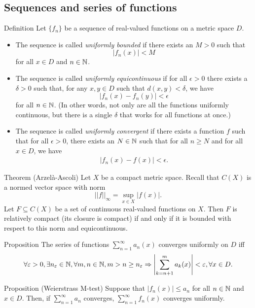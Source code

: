 \subsection{Sequences and series of functions}
\begin{defnbox}{Definition}
Let $\{f_n\}$ be a sequence of real-valued functions on a metric space $D$.
\begin{itemize}
    \item The sequence is called \emph{uniformly bounded} if there exists an $M > 0$ such that
    $$ |f_n(x)| < M $$
    for all $x \in D$ and $n \in \mathbb{N}$.
    \item The sequence is called \emph{uniformly equicontinuous} if for all $\epsilon > 0$ there exists a $\delta > 0$ such that, for any $x, y \in D$ such that $d(x,y) < \delta$, we have
    $$ |f_n(x) - f_n(y)| < \epsilon $$
    for all $n \in \mathbb{N}$. (In other words, not only are all the functions uniformly continuous, but there is a single $\delta$ that works for all functions at once.)
    \item The sequence is called \emph{uniformly convergent} if there exists a function $f$ such that for all $\epsilon > 0$, there exists an $N \in \mathbb{N}$ such that for all $n \ge N$ and for all $x\in D$, we have
    \begin{align*}
        |f_n(x) - f(x)| < \epsilon.
    \end{align*}
\end{itemize}
\end{defnbox}
\begin{thmbox}{Theorem (Arzelà-Ascoli)}
Let $X$ be a compact metric space. Recall that $C(X)$ is a normed vector space with norm
$$ ||f||_\infty = \sup_{x \in X} |f(x)|. $$
Let $F \subseteq C(X)$ be a set of continuous real-valued functions on $X$. Then $F$ is relatively compact (its closure is compact) if and only if it is bounded with respect to this norm and equicontinuous.
\end{thmbox}
\begin{thmbox}{Proposition}
The series of functions $\displaystyle{\sum_{n=1}^\infty} a_n(x)$ converges uniformly on $D$ iff
\begin{align*}
    \forall \varepsilon > 0, \exists n_\varepsilon \in \mathbb{N}, \forall m,n \in \mathbb{N}, m > n \ge n_\varepsilon \Rightarrow \left\lvert \sum_{k=n+1}^m a_k(x)\right\rvert < \varepsilon, \forall x \in D.
\end{align*}
\end{thmbox}
\begin{thmbox}{Proposition (Weierstrass M-test)}
Suppose that $|f_n(x)| \le a_n$ for all $n \in \mathbb{N}$ and $x \in D$. Then, if $\displaystyle{\sum_{n=1}^\infty} a_n$ converges, $\displaystyle{\sum_{n=1}^\infty} f_n(x)$ converges uniformly.
\end{thmbox}
